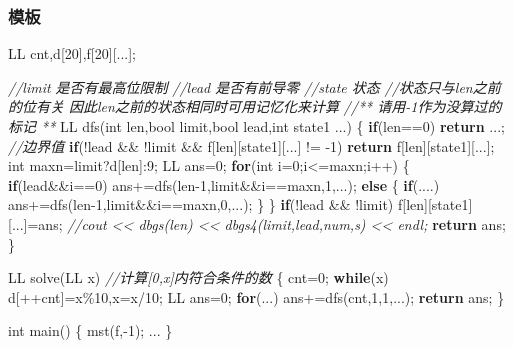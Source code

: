 \documentclass[
]{article}
\newenvironment{Shaded}{}{}
\newcommand{\CommentTok}[1]{\textcolor[rgb]{0.38,0.63,0.69}{\textit{#1}}}
\newcommand{\ControlFlowTok}[1]{\textcolor[rgb]{0.00,0.44,0.13}{\textbf{#1}}}
\newcommand{\DataTypeTok}[1]{\textcolor[rgb]{0.56,0.13,0.00}{#1}}
\newcommand{\DecValTok}[1]{\textcolor[rgb]{0.25,0.63,0.44}{#1}}
\newcommand{\NormalTok}[1]{#1}
\begin{document}
\hypertarget{ux6a21ux677f-14}{%
\subsubsection{模板}\label{ux6a21ux677f-14}}

\begin{Shaded}
\begin{Highlighting}[]
\NormalTok{LL cnt,d[}\DecValTok{20}\NormalTok{],f[}\DecValTok{20}\NormalTok{][...];}

\CommentTok{//limit 是否有最高位限制}
\CommentTok{//lead  是否有前导零}
\CommentTok{//state 状态}
\CommentTok{//状态只与len之前的位有关 因此len之前的状态相同时可用记忆化来计算}
\CommentTok{//** 请用{-}1作为没算过的标记 **}
\NormalTok{LL dfs(}\DataTypeTok{int}\NormalTok{ len,}\DataTypeTok{bool}\NormalTok{ limit,}\DataTypeTok{bool}\NormalTok{ lead,}\DataTypeTok{int}\NormalTok{ state1 ...)}
\NormalTok{\{}
    \ControlFlowTok{if}\NormalTok{(len==}\DecValTok{0}\NormalTok{) }\ControlFlowTok{return}\NormalTok{ ...; }\CommentTok{//边界值}
    \ControlFlowTok{if}\NormalTok{(!lead \&\& !limit  \&\& f[len][state1][...] != {-}}\DecValTok{1}\NormalTok{)  }\ControlFlowTok{return}\NormalTok{ f[len][state1][...];}
    \DataTypeTok{int}\NormalTok{ maxn=limit?d[len]:}\DecValTok{9}\NormalTok{;}
\NormalTok{    LL ans=}\DecValTok{0}\NormalTok{;}
    \ControlFlowTok{for}\NormalTok{(}\DataTypeTok{int}\NormalTok{ i=}\DecValTok{0}\NormalTok{;i\textless{}=maxn;i++)}
\NormalTok{    \{}
        \ControlFlowTok{if}\NormalTok{(lead\&\&i==}\DecValTok{0}\NormalTok{)}
\NormalTok{            ans+=dfs(len{-}}\DecValTok{1}\NormalTok{,limit\&\&i==maxn,}\DecValTok{1}\NormalTok{,...);}
        \ControlFlowTok{else}
\NormalTok{        \{}
            \ControlFlowTok{if}\NormalTok{(....)}
\NormalTok{                ans+=dfs(len{-}}\DecValTok{1}\NormalTok{,limit\&\&i==maxn,}\DecValTok{0}\NormalTok{,...);}
\NormalTok{        \}}
\NormalTok{    \}}
    \ControlFlowTok{if}\NormalTok{(!lead \&\& !limit) f[len][state1][...]=ans;}
    \CommentTok{//cout \textless{}\textless{} dbgs(len) \textless{}\textless{} dbgs4(limit,lead,num,s) \textless{}\textless{} endl;}
    \ControlFlowTok{return}\NormalTok{ ans;}
\NormalTok{\}}

\NormalTok{LL solve(LL x) }\CommentTok{//计算[0,x]内符合条件的数}
\NormalTok{\{}
\NormalTok{    cnt=}\DecValTok{0}\NormalTok{;}
    \ControlFlowTok{while}\NormalTok{(x) d[++cnt]=x\%}\DecValTok{10}\NormalTok{,x=x/}\DecValTok{10}\NormalTok{;}
\NormalTok{    LL ans=}\DecValTok{0}\NormalTok{;}
    \ControlFlowTok{for}\NormalTok{(...) ans+=dfs(cnt,}\DecValTok{1}\NormalTok{,}\DecValTok{1}\NormalTok{,...);}
    \ControlFlowTok{return}\NormalTok{ ans;}
\NormalTok{\}}

\DataTypeTok{int}\NormalTok{ main()}
\NormalTok{\{}
\NormalTok{    mst(f,{-}}\DecValTok{1}\NormalTok{);}
\NormalTok{    ...}
\NormalTok{\}}
\end{Highlighting}
\end{Shaded}
\end{document}
